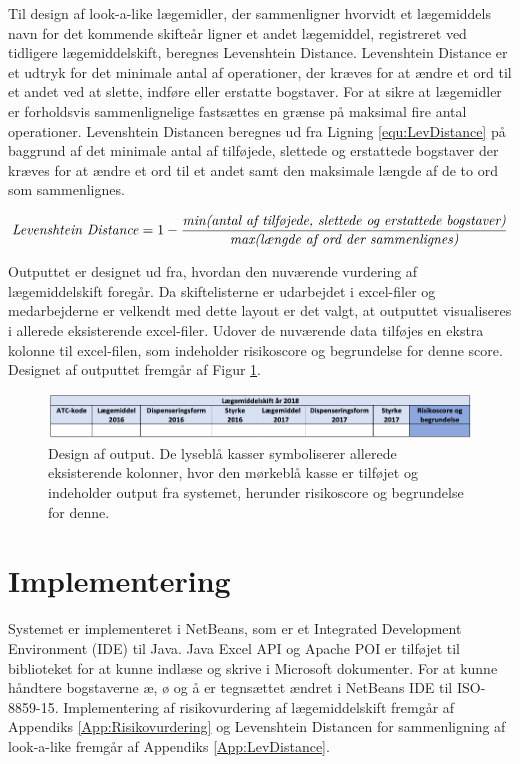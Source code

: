 Til design af look-a-like lægemidler, der sammenligner hvorvidt et lægemiddels navn for det kommende skifteår ligner et andet lægemiddel, registreret ved tidligere lægemiddelskift, beregnes Levenshtein Distance. Levenshtein Distance er et udtryk for det minimale antal af operationer, der kræves for at ændre et ord til et andet ved at slette, indføre eller erstatte bogstaver. For at sikre at lægemidler er forholdsvis sammenlignelige fastsættes en grænse på maksimal fire antal operationer. Levenshtein Distancen beregnes ud fra Ligning \ref{equ:LevDistance} på baggrund af det minimale antal af tilføjede, slettede og erstattede bogstaver der kræves for at ændre et ord til et andet samt den maksimale længde af de to ord som sammenlignes. 

\begin{equation} \label{equ:LevDistance}
\mbox{\textit{Levenshtein Distance}} = 1 - \frac{\mbox{\textit{min(antal af tilføjede, slettede og erstattede bogstaver)}}}{\mbox{\textit{max(længde af ord der sammenlignes)}}}   
\end{equation}

Outputtet er designet ud fra, hvordan den nuværende vurdering af lægemiddelskift foregår. Da skiftelisterne er udarbejdet i excel-filer og medarbejderne er velkendt med dette layout er det valgt, at outputtet visualiseres i allerede eksisterende excel-filer. Udover de nuværende data tilføjes en ekstra kolonne til excel-filen, som indeholder risikoscore og begrundelse for denne score. Designet af outputtet fremgår af Figur \ref{fig:Output}.

\vspace{0.2cm}
\begin{figure}[H]\centering
\includegraphics[width=1\textwidth]{billeder/Output.png} 
	\caption{Design af output. De lyseblå kasser symboliserer allerede eksisterende kolonner, hvor den mørkeblå kasse er tilføjet og indeholder output fra systemet, herunder risikoscore og begrundelse for denne.}
	\label{fig:Output}  
\end{figure}

\newpage
\section{Implementering}
Systemet er implementeret i NetBeans, som er et Integrated Development Environment (IDE) til Java.  Java Excel API og Apache POI er tilføjet til biblioteket for at kunne indlæse og skrive i Microsoft dokumenter. For at kunne håndtere bogstaverne æ, ø og å er tegnsættet ændret i NetBeans IDE til ISO-8859-15. Implementering af risikovurdering af lægemiddelskift fremgår af Appendiks \ref{App:Risikovurdering} og Levenshtein Distancen for sammenligning af look-a-like fremgår af Appendiks \ref{App:LevDistance}.

